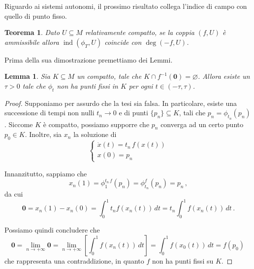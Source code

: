\documentclass[a4paper, 11pt]{article}
\theoremstyle{definition}
\theoremstyle{plain}
\newtheorem{Lemma}[Def]{Lemma}
\newtheorem{Teo}[Def]{Teorema}
\newcommand{\zero}{\mathbf{0}}
\newcommand{\eset}{\varnothing}
\DeclareMathOperator{\ind}{ind}
\begin{document}
Riguardo ai sistemi autonomi, il prossimo risultato collega l'indice di campo con quello di punto fisso.
\begin{Teo}
	Dato $U \subseteq M$ relativamente compatto, se la coppia $(f,U)$ è ammissibile allora $\ind(\phi_T, U)$ coincide con $\deg(-f, U)$.
\end{Teo}
Prima della sua dimostrazione premettiamo dei Lemmi.
\begin{Lemma}\label{Lemma:flowfissi}
	Sia $K \subseteq M$ un compatto, tale che $K \cap f^{-1}(\zero) = \eset$. Allora esiste un $\tau >0 $ tale che $\phi_t$ non ha punti fissi in $K$ per ogni $t \in (-\tau, \tau)$.
\end{Lemma}
\begin{proof}
	Supponiamo per assurdo che la tesi sia falsa. In particolare, esiste una successione di tempi non nulli $t_n \to 0$ e di punti $\{p_n\} \subseteq K$, tali che $p_n = \phi_{t_n}(p_n)$. Siccome $K$ è compatto, possiamo supporre che $p_n$ converga ad un certo punto $p_0 \in K$. Inoltre, sia $x_n$ la soluzione di 
	\[
		\begin{cases}
			\dot{x}(t) = t_n\,f(x(t))\\
			x(0) = p_n
		\end{cases}
	\]
	
	Innanzitutto, sappiamo che
	\[
		x_n(1) = \phi_1^{t_n\,f}(p_n) = \phi_{t_n}^{f}(p_n) = p_n\,,
	\]
	da cui
	\[
		\zero = x_n(1) - x_n(0) = \int_0^1t_nf (x_n(t))\,dt = t_n\int_0^1f(x_n(t))\,dt\,.
	\]
	
	Possiamo quindi concludere che
	\[
		\zero = \lim_{n\to+\infty}\zero = \lim_{n \to +\infty}\left[\int_0^1f(x_n(t))\,dt \right] = \int_0^1f(x_0(t))\,dt = f(p_0)\,
	\]
	che rappresenta una contraddizione, in quanto $f$ non ha punti fissi su $K$.
\end{proof}
\end{document}
